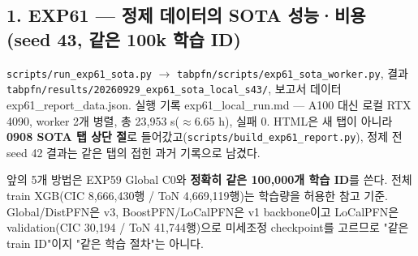 \subsection{1. EXP61 — 정제 데이터의 SOTA 성능·비용 (seed 43, 같은 100k 학습 ID)}
\texttt{scripts/\allowbreak{}\allowbreak{}run\_\allowbreak{}\allowbreak{}exp6\allowbreak{}1\_\allowbreak{}\allowbreak{}sota.\allowbreak{}p\allowbreak{}y}  \ensuremath{\rightarrow}  \texttt{tabpfn/\allowbreak{}\allowbreak{}s\allowbreak{}cripts/\allowbreak{}\allowbreak{}e\allowbreak{}xp61\_\allowbreak{}\allowbreak{}sot\allowbreak{}a\_\allowbreak{}\allowbreak{}worker\allowbreak{}.\allowbreak{}py}, 결과 \texttt{tabpfn/\allowbreak{}\allowbreak{}r\allowbreak{}esults/\allowbreak{}\allowbreak{}2\allowbreak{}0260929\_\allowbreak{}\allowbreak{}exp61\_\allowbreak{}\allowbreak{}so\allowbreak{}ta\_\allowbreak{}\allowbreak{}local\allowbreak{}\_\allowbreak{}\allowbreak{}s43/\allowbreak{}\allowbreak{}}, 보고서 데이터 exp61\_\allowbreak{}report\_\allowbreak{}data.json. 실행 기록 exp61\_\allowbreak{}local\_\allowbreak{}run.md — A100 대신 로컬 RTX 4090, worker 2개 병렬, 총 23,953 s(\ensuremath{\approx}6.65 h), 실패 0. HTML은 새 탭이 아니라 \textbf{0908 SOTA 탭 상단 절}로 들어갔고(\texttt{scripts/\allowbreak{}\allowbreak{}build\_\allowbreak{}\allowbreak{}ex\allowbreak{}p61\_\allowbreak{}\allowbreak{}repo\allowbreak{}rt.\allowbreak{}py}), 정제 전 seed 42 결과는 같은 탭의 접힌 과거 기록으로 남겼다.

앞의 5개 방법은 EXP59 Global C0와 \textbf{정확히 같은 100,000개 학습 ID}를 쓴다. 전체 train XGB(CIC 8,666,430행 /\allowbreak{} ToN 4,669,119행)는 학습량을 허용한 참고 기준. Global/\allowbreak{}DistPFN은 v3, BoostPFN/\allowbreak{}LoCalPFN은 v1 backbone이고 LoCalPFN은 validation(CIC 30,194 /\allowbreak{} ToN 41,744행)으로 미세조정 checkpoint를 고르므로 "같은 train ID"이지 "같은 학습 절차"는 아니다.


